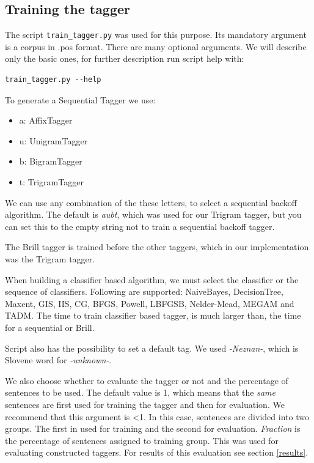 \documentclass[10pt, conference, compsocconf]{IEEEtran}
\begin{document}
\subsection{Training the tagger} %
The script \texttt{train\_tagger.py} was used for this purpose. Its mandatory argument is a corpus in .pos format. There are many optional arguments. We will describe only the basic ones, for further description run script help with:
\begin{lstlisting}
train_tagger.py --help
\end{lstlisting}
\par
To generate a Sequential Tagger we use:
\begin{itemize}
\item a: AffixTagger
\item u: UnigramTagger
\item b: BigramTagger
\item t: TrigramTagger
\end{itemize}
We can use any combination of the these letters, to select a sequential backoff algorithm.
The default is \textit{aubt}, which was used for our Trigram tagger, but you can set this to the empty string not to train a sequential backoff tagger.
\par
The Brill tagger is trained before the other taggers, which in our implementation was the Trigram tagger.
\par
When building a classifier based algorithm, we must select the classifier or the sequence of classifiers. Following are supported: NaiveBayes, DecisionTree, Maxent, GIS, IIS, CG, BFGS, Powell, LBFGSB, Nelder-Mead, MEGAM and TADM. The time to train classifier based tagger, is much larger than, the time for a sequential or Brill.
\par
Script also has the possibility to set a default tag. We used \textit{-Neznan-}, which is Slovene word for \textit{-unknown-}.
\par
We also choose whether to evaluate the tagger or not and the percentage of sentences to be used. The default value is 1, which means that the \textit{same} sentences are first used for training the tagger and then for evaluation. We recommend that this argument is <1. In this case, sentences are divided into two groups. The first in used for training and the second for evaluation. \textit{Fraction} is the percentage of sentences assigned to training group. 
This was used for evaluating constructed taggers. For results of this evaluation see section \ref{results}.
\end{document}
